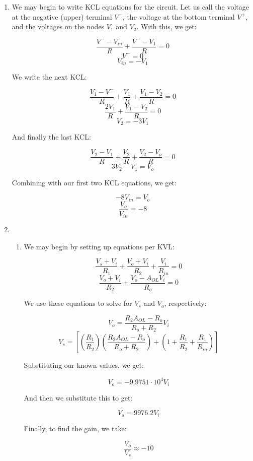 \begin{enumerate}

  \item

    We may begin to write KCL equations for the circuit. Let us call the voltage at the negative (upper) terminal $V^{-}$, the voltage at the bottom terminal $V^{+}$, and the voltages on the nodes $V_1$ and $V_2$. With this, we get:

    $$\frac{V^{-}-V_{in}}{R}+\frac{V^{-}-V_1}{R}=0$$
    $$V^{-}=0$$
    $$V_{in}=-V_{1}$$

    We write the next KCL:

    $$\frac{V_1-V^{-}}{R}+\frac{V_1}{R}+\frac{V_1-V_2}{R}=0$$
    $$\frac{2V_1}{R}+\frac{V_1-V_2}{R}=0$$
    $$V_2=-3V_1$$

    And finally the last KCL:

    $$\frac{V_2-V_1}{R}+\frac{V_2}{R}+\frac{V_2-V_o}{R}=0$$
    $$3V_2-V_1=V_o$$

    Combining with our first two KCL equations, we get:

    $$-8V_{in}=V_o$$
    $$\boxed{\frac{V_o}{V_{in}}=-8}$$

  \item

    \begin{enumerate}

      \item 

        We may begin by setting up equations per KVL:

        $$\frac{V_s+V_i}{R_1}+\frac{V_o+V_i}{R_2}+\frac{V_i}{R_{in}}=0$$
        $$\frac{V_o+V_i}{R_2}+\frac{V_o-A_{OL}V_i}{R_o}=0$$

        We use these equations to solve for $V_s$ and $V_o$, respectively:

        $$V_o=\frac{R_2A_{OL}-R_o}{R_o+R_2}V_i$$
        $$V_s=\left[ \left( \frac{R_1}{R_2} \right)\left( \frac{R_2A_{OL}-R_o}{R_o+R_2} \right)+\left( 1+\frac{R_1}{R_2}+\frac{R_1}{R_{in}} \right) \right]$$

        Substituting our known values, we get:

        $$V_o=-9.9751\cdot10^{4}V_i$$

        And then we substitute this to get:

        $$V_s=9976.2V_i$$

        Finally, to find the gain, we take:

        $$\boxed{\frac{V_o}{V_s}\approx -10}$$


\end{enumerate}
\end{enumerate}
